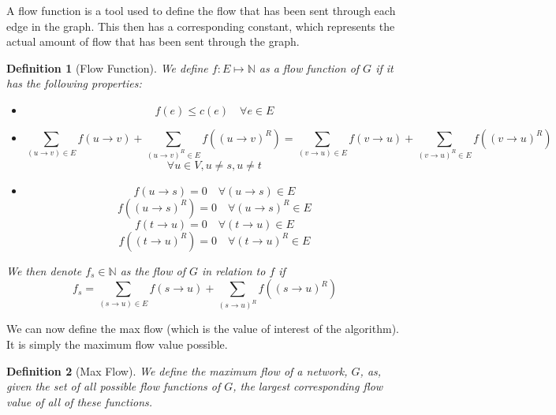\documentclass{report}
\newtheorem{definition}{Definition}[section]
\begin{document}
A flow function is a tool used to define the flow that has been sent through each edge in the graph. This then has a corresponding constant, which represents the actual amount of flow that has been sent through the graph.
\begin{definition}[Flow Function]
    We define $f : E \mapsto \mathbb{N}$ as a flow function of $G$ if it has the following properties:
    \begin{itemize}
        \item
            $$f(e) \le c(e) \quad \forall e \in E$$
        \item
            $$\sum_{(u \rightarrow v) \in E}f(u \rightarrow v) + \sum_{(u \rightarrow v)^R \in E}f((u \rightarrow v)^R) = \sum_{(v \rightarrow u) \in E}f(v \rightarrow u) + \sum_{(v \rightarrow u)^R \in E}f((v \rightarrow u)^R)$$
            $$\forall u \in V, u \ne s, u \ne t$$
        \item
            $$f(u \rightarrow s) = 0 \quad \forall (u \rightarrow s) \in E$$
            $$f((u \rightarrow s)^R) = 0 \quad \forall (u \rightarrow s)^R \in E$$
            $$f(t \rightarrow u) = 0 \quad \forall (t \rightarrow u) \in E$$
            $$f((t \rightarrow u)^R) = 0 \quad \forall (t \rightarrow u)^R \in E$$
    \end{itemize}
    We then denote $f_s \in \mathbb{N}$ as the flow of $G$ in relation to $f$ if
    $$f_s = \sum_{(s \rightarrow u) \in E}f(s \rightarrow u) + \sum_{(s \rightarrow u)^R}f((s \rightarrow u)^R)$$
\end{definition}

We can now define the max flow (which is the value of interest of the algorithm). It is simply the maximum flow value possible.
\begin{definition}[Max Flow]
    We define the maximum flow of a network, $G$, as, given the set of all possible flow functions of $G$, the largest corresponding flow value of all of these functions.
\end{definition}
\end{document}
